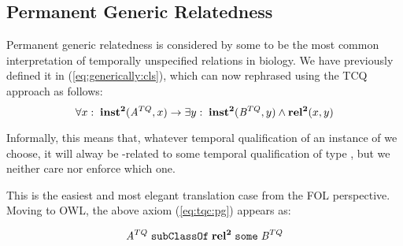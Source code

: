 


\subsection*{Permanent Generic Relatedness}
Permanent generic relatedness is considered by some to be the most common
interpretation of temporally unspecified relations in biology. We have
previously defined it in (\ref{eq:generically:cls}), which can
now rephrased using the TCQ approach as follows:
\begin{equation}
\forall x:\; \mathrm{\mathbf{inst^2}}(\mathit{A}^{TQ},x) \rightarrow \exists y :\;
\mathrm{\mathbf{inst^2}}(\mathit{B}^{TQ}, y) \wedge \mathrm{\mathbf{rel^2}}(x,y)
\label{eq:tqc:pg}
\end{equation}

Informally, this means that, whatever temporal qualification of an instance of
 we choose, it will alway be -related to some temporal
qualification of type , but we neither care nor enforce which one.

This is the easiest and most elegant translation case from the FOL perspective.
Moving to OWL, the above axiom (\ref{eq:tqc:pg}) appears as:

\begin{equation}
\mathit{A}^{TQ}\;\mathtt{subClassOf}\;\mathrm{\mathbf{rel^2}}\;\mathtt{some}\;\mathit{B}^{TQ}
\label{eq:tqc:pg:owl}
\end{equation}


